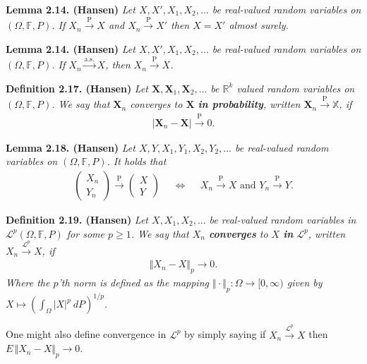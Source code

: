 \documentclass[a4paper,12pt,openany]{book}
\begin{document}
\textbf{Lemma 2.14. (Hansen)} \emph{Let \(X,X',X_1,X_2,...\) be real-valued random variables on \((\Omega,\mathbb{F},P)\). If \(X_n\stackrel{\text{P}}{\to} X\) and \(X_n\stackrel{\text{P}}{\to} X'\) then \(X=X'\) almost surely.}

\textbf{Lemma 2.14. (Hansen)} \emph{Let \(X,X',X_1,X_2,...\) be real-valued random variables on \((\Omega,\mathbb{F},P)\). If \(X_n\stackrel{\text{a.s.}}{\to} X\), then \(X_n\stackrel{\text{P}}{\to} X\).}

\textbf{Definition 2.17. (Hansen)} \emph{Let \(\mathbf{X},\mathbf{X}_1,\mathbf{X}_2,...\) be \(\mathbb{R}^k\) valued random variables on \((\Omega, \mathbb{F},P)\). We say that \(\mathbf{X}_n\) converges to \(\mathbf{X}\) \textbf{in probability}, written \(\mathbf{X}_n\stackrel{\text{P}}{\to} \mathbb{X}\), if}
\begin{align*}
    \vert \mathbf{X}_n-\mathbf{X}\vert \stackrel{\text{P}}{\to} 0.\tag{2.23}
\end{align*}

\textbf{Lemma 2.18. (Hansen)} \emph{Let \(X,Y,X_1,Y_1,X_2,Y_2,...\) be real-valued random variables on \((\Omega,\mathbb{F},P)\). It holds that}
\begin{align*}
    \begin{pmatrix}
    X_n\\Y_n
    \end{pmatrix}\stackrel{\text{P}}{\to} \begin{pmatrix}
    X\\Y
    \end{pmatrix}\hspace{15pt}\iff \hspace{15pt} X_n\stackrel{\text{P}}{\to} X\text{ and }Y_n\stackrel{\text{P}}{\to} Y.\tag{2.24}
\end{align*}

\textbf{Definition 2.19. (Hansen)} \emph{Let \(X,X_1,X_2,...\) be real-valued random variables in \(\mathcal{L}^p(\Omega,\mathbb{F},P)\) for some \(p\ge 1\). We say that \(X_n\) \textbf{converges} to \(X\) \textbf{in} \(\mathcal{L}^p\), written \(X_n\stackrel{\mathcal{L}^p}{\to} X\), if}
\begin{align*}
    \Vert X_n - X\Vert_p\to 0.\tag{2.27}
\end{align*}
\emph{Where the \(p\)'th norm is defined as the mapping \(\Vert \cdot \Vert_p : \Omega\to [0,\infty)\) given by \(X\mapsto \left(\int_\Omega \vert X\vert ^p\ dP\right)^{1/p}\).}

One might also define convergence in \(\mathcal{L}^p\) by simply saying if \(X_n\stackrel{\mathcal{L}^p}{\to} X\) then \(E\,\Vert X_n-X\Vert_p\to 0\).
\end{document}
